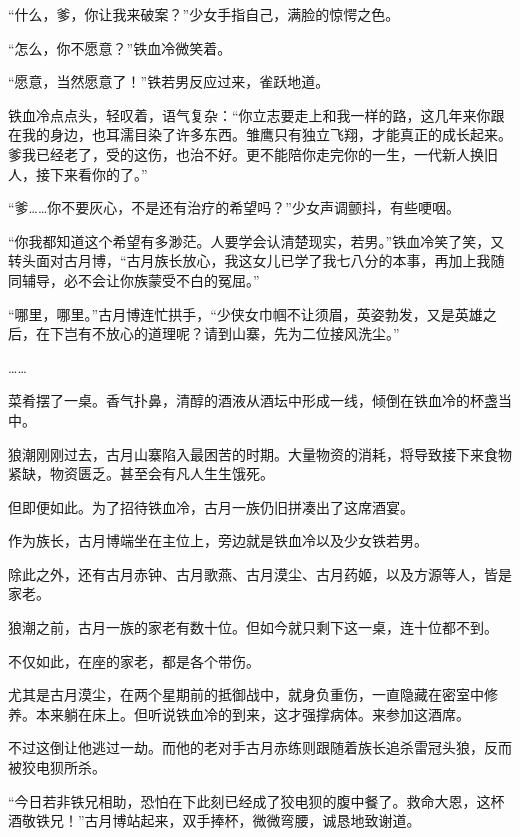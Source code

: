 
\begin{this_body}

“什么，爹，你让我来破案？”少女手指自己，满脸的惊愕之色。

“怎么，你不愿意？”铁血冷微笑着。

“愿意，当然愿意了！”铁若男反应过来，雀跃地道。

铁血冷点点头，轻叹着，语气复杂：“你立志要走上和我一样的路，这几年来你跟在我的身边，也耳濡目染了许多东西。雏鹰只有独立飞翔，才能真正的成长起来。爹我已经老了，受的这伤，也治不好。更不能陪你走完你的一生，一代新人换旧人，接下来看你的了。”

“爹……你不要灰心，不是还有治疗的希望吗？”少女声调颤抖，有些哽咽。

“你我都知道这个希望有多渺茫。人要学会认清楚现实，若男。”铁血冷笑了笑，又转头面对古月博，“古月族长放心，我这女儿已学了我七八分的本事，再加上我随同辅导，必不会让你族蒙受不白的冤屈。”

“哪里，哪里。”古月博连忙拱手，“少侠女巾帼不让须眉，英姿勃发，又是英雄之后，在下岂有不放心的道理呢？请到山寨，先为二位接风洗尘。”

……

菜肴摆了一桌。香气扑鼻，清醇的酒液从酒坛中形成一线，倾倒在铁血冷的杯盏当中。

狼潮刚刚过去，古月山寨陷入最困苦的时期。大量物资的消耗，将导致接下来食物紧缺，物资匮乏。甚至会有凡人生生饿死。

但即便如此。为了招待铁血冷，古月一族仍旧拼凑出了这席酒宴。

作为族长，古月博端坐在主位上，旁边就是铁血冷以及少女铁若男。

除此之外，还有古月赤钟、古月歌燕、古月漠尘、古月药姬，以及方源等人，皆是家老。

狼潮之前，古月一族的家老有数十位。但如今就只剩下这一桌，连十位都不到。

不仅如此，在座的家老，都是各个带伤。

尤其是古月漠尘，在两个星期前的抵御战中，就身负重伤，一直隐藏在密室中修养。本来躺在床上。但听说铁血冷的到来，这才强撑病体。来参加这酒席。

不过这倒让他逃过一劫。而他的老对手古月赤练则跟随着族长追杀雷冠头狼，反而被狡电狈所杀。

“今日若非铁兄相助，恐怕在下此刻已经成了狡电狈的腹中餐了。救命大恩，这杯酒敬铁兄！”古月博站起来，双手捧杯，微微弯腰，诚恳地致谢道。


\end{this_body}
